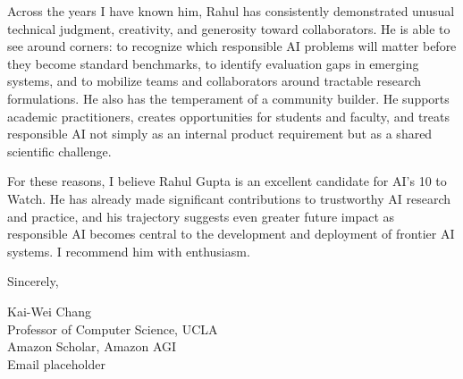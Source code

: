 \documentclass[11pt]{article}
\begin{document}
Across the years I have known him, Rahul has consistently demonstrated unusual technical judgment, creativity, and generosity toward collaborators. He is able to see around corners: to recognize which responsible AI problems will matter before they become standard benchmarks, to identify evaluation gaps in emerging systems, and to mobilize teams and collaborators around tractable research formulations. He also has the temperament of a community builder. He supports academic practitioners, creates opportunities for students and faculty, and treats responsible AI not simply as an internal product requirement but as a shared scientific challenge.

For these reasons, I believe Rahul Gupta is an excellent candidate for AI's 10 to Watch. He has already made significant contributions to trustworthy AI research and practice, and his trajectory suggests even greater future impact as responsible AI becomes central to the development and deployment of frontier AI systems. I recommend him with enthusiasm.

Sincerely,

Kai-Wei Chang\\
Professor of Computer Science, UCLA\\
Amazon Scholar, Amazon AGI\\
Email placeholder
\end{document}
